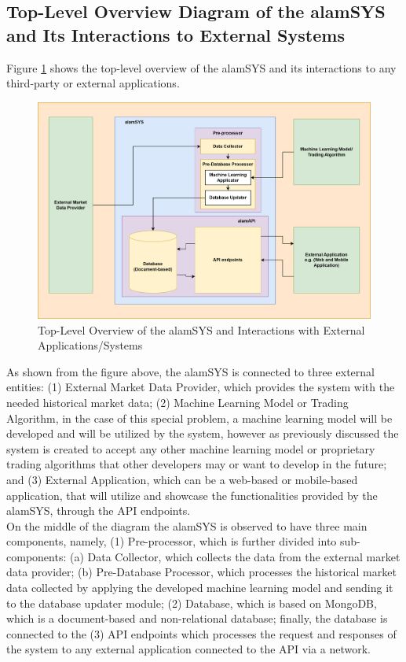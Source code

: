 \subsection{Top-Level Overview Diagram of the alamSYS and Its Interactions to External Systems}
\label{subsec:top_level_overview}

Figure \ref{fig:system_overview} shows the top-level overview of the 
alamSYS and its interactions to any third-party or external applications.

\begin{figure}[ht]
    \centering
    \includegraphics[width=1\textwidth]{./assets/SystemOverview.png}
    \caption{Top-Level Overview of the alamSYS and Interactions with External Applications/Systems}
    \label{fig:system_overview}
\end{figure}
\FloatBarrier

As shown from the figure above, the alamSYS is connected to three external 
entities: (1) External Market Data Provider, which provides the system with the 
needed historical market data; (2) Machine Learning Model or Trading Algorithm, 
in the case of this special problem, a machine learning model will be developed and 
will be utilized by the system, however as previously discussed the system is 
created to accept any other machine learning model or proprietary trading algorithms 
that other developers may or want to develop in the future; and 
(3) External Application, which can be a web-based or mobile-based application, that
will utilize and showcase the functionalities provided by the alamSYS, through the
API endpoints.
\hfill \\

On the middle of the diagram the alamSYS is observed to have three main components, 
namely, (1) Pre-processor, which is further divided into sub-components: 
(a) Data Collector, which collects the data from the external market data provider; 
(b) Pre-Database Processor, which processes the historical market data collected by 
applying the developed machine learning model and sending it to the database updater 
module; (2) Database, which is based on MongoDB, which is a document-based and non-relational 
database; finally, the database is connected to the (3) API endpoints which processes 
the request and responses of the system to any external application connected to the 
API via a network.